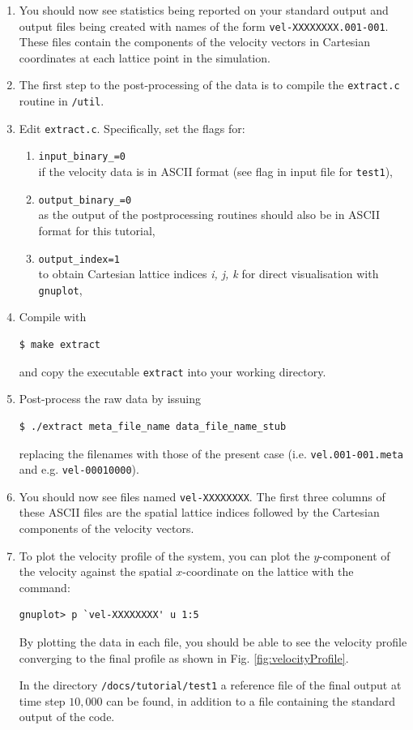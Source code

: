 \documentclass[11pt,twoside,a4paper]{article}
\begin{document}
\begin{enumerate}
\item You should now see statistics being reported on your standard output and 
output files being created with names of the form \texttt{vel-XXXXXXXX.001-001}. 
These files contain the components of the velocity vectors in Cartesian coordinates at each lattice point in the simulation. 
\item The first step to the post-processing of the data is to compile the \texttt{extract.c} 
routine in \texttt{/util}. 
\item Edit \texttt{extract.c}. Specifically, set the flags for:
\begin{enumerate}
\item \texttt{input\_binary\_=0} \\ if the velocity data is in ASCII format (see flag in input file for \texttt{test1}),
\item \texttt{output\_binary\_=0} \\ as the output of the postprocessing routines should also be in ASCII format for this tutorial,
\item \texttt{output\_index=1} \\ to obtain Cartesian lattice indices \textit{i, j, k} for direct visualisation with \texttt{gnuplot}, 
\end{enumerate}
\item Compile with 
\begin{lstlisting}
$ make extract 
\end{lstlisting} 
and copy the executable \texttt{extract} into your working directory.
\item Post-process the raw data by issuing 
\begin{lstlisting}
$ ./extract meta_file_name data_file_name_stub
\end{lstlisting} 
replacing the filenames with those of the present case (i.e. \texttt{vel.001-001.meta} and e.g. \texttt{vel-00010000}).
\item You should now see files named \texttt{vel-XXXXXXXX}.
The first three columns of these ASCII files are the spatial lattice indices followed by the Cartesian components of the velocity vectors.\\
\item To plot the velocity profile of the system, you can plot the $y$-component of the velocity against 
the spatial $x$-coordinate on the lattice with the command:
\begin{lstlisting}
gnuplot> p `vel-XXXXXXXX' u 1:5
\end{lstlisting} 
By plotting the data in each file, you should be able to see the velocity profile converging to the final profile as shown in Fig. \ref{fig:velocityProfile}. 

In the directory \texttt{/docs/tutorial/test1} a reference file of the final 
output at time step $10,000$ can be found, in addition to a file containing the standard output of the code.
\end{enumerate} 
\end{document}
